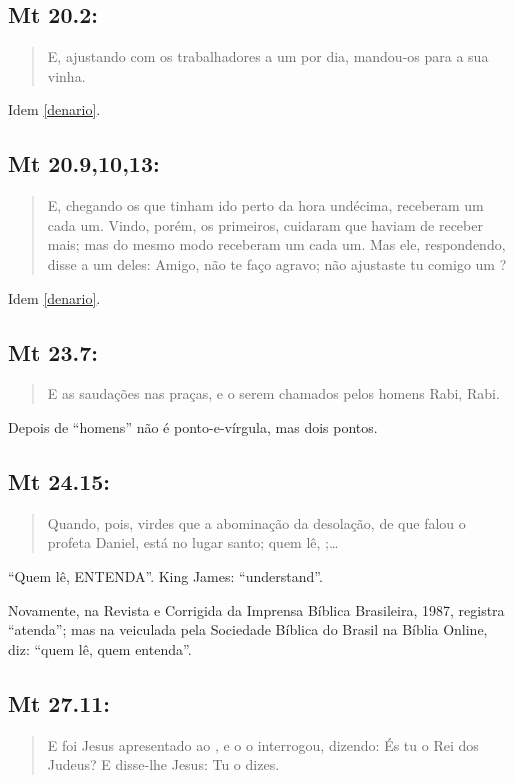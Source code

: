 \subsection{Mt 20.2:}
\begin{quote} \small E, ajustando com os trabalhadores a um  por dia, man\-dou-os para a sua vinha.\end{quote}
Idem \ref{denario}.


\subsection{Mt 20.9,10,13:}
\begin{quote}
 \small
 E, chegando os que tinham ido perto da hora undécima, receberam um  cada um. Vindo, porém, os primeiros, cuidaram que haviam de receber mais; mas do mesmo modo receberam um  cada um. Mas ele, respondendo, disse a um deles: Amigo, não te faço agravo; não ajustaste tu comigo um ?
\end{quote}

Idem \ref{denario}.

\subsection{Mt 23.7:}
\begin{quote}
 \small
 E as saudações nas praças, e o serem chamados pelos homens\uwave{;} Rabi, Rabi.
\end{quote}

Depois de ``homens'' não é ponto-e-vírgula, mas dois pontos.


\subsection{Mt 24.15:}
\begin{quote}
 \small
Quando, pois, virdes que a abominação da desolação, de
que falou o profeta Daniel, está no lugar santo; quem lê, ;\ldots
\end{quote}
``Quem lê, ENTENDA''. King James: ``understand''.

 Novamente, na Revista e Corrigida da Imprensa Bíblica Brasileira,
 1987, registra ``atenda''; mas na veiculada pela Sociedade Bíblica do
 Brasil na Bíblia Online, diz: ``quem lê, quem entenda''.

\subsection{Mt 27.11:}\label{govern}
\begin{quote}
 \small
 E foi Jesus apresentado ao , e o  o interrogou, dizendo: És tu o Rei dos Judeus? E disse-lhe Jesus: Tu o dizes.
\end{quote}

